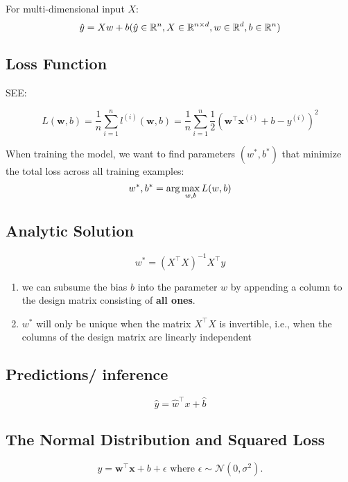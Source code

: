 \noindent
For multi-dimensional input $X$:
\[
    \hfill
    \hat{y} = Xw + b
    \hfill
    (
        \hat{y} \in \mathbb{R}^n,
        X \in \mathbb{R}^{n\times d}, 
        w \in \mathbb{R}^d,
        b \in \mathbb{R}^n
    )
\]

\subsection{Loss Function \cite{dnn-1}}
SEE: 

\[
    {\displaystyle L(\mathbf{w}, b) =\frac{1}{n}\sum_{i=1}^n l^{(i)}(\mathbf{w}, b) =\frac{1}{n} \sum_{i=1}^n \frac{1}{2}\left(\mathbf{w}^\top \mathbf{x}^{(i)} + b - y^{(i)}\right)^2}
\]

When training the model, we want to find parameters $(w^\ast, b^\ast)$ that minimize the total loss
across all training examples:
\[
    \displaystyle
    \hfill
        w^\ast, b^\ast = \arg\max_{w,b} L(w,b)
    \hfill
\]

\subsection{Analytic Solution \cite{dnn-1}}


\[
    w^\ast = (X^\top X)^{-1}X^\top y
\]

\begin{enumerate}
    \item we can subsume the bias $b$ into the parameter $w$ by appending a column to the design matrix consisting of \textbf{all ones}.

    \item $w^\ast$ will only be unique when the matrix $X^\top X$ is invertible, i.e., when the columns of the design matrix are linearly independent
\end{enumerate}


\subsection{Predictions/ inference \cite{dnn-1}}
\[
    \hat{y} = \hat{w}^\top x + \hat{b}
\]

\subsection{The Normal Distribution and Squared Loss \cite{dnn-1}}

\[
    y = \mathbf{w}^\top \mathbf{x} + b + \epsilon 
    \textrm{ where } 
    \epsilon \sim \mathcal{N}(0, \sigma^2).
\]

